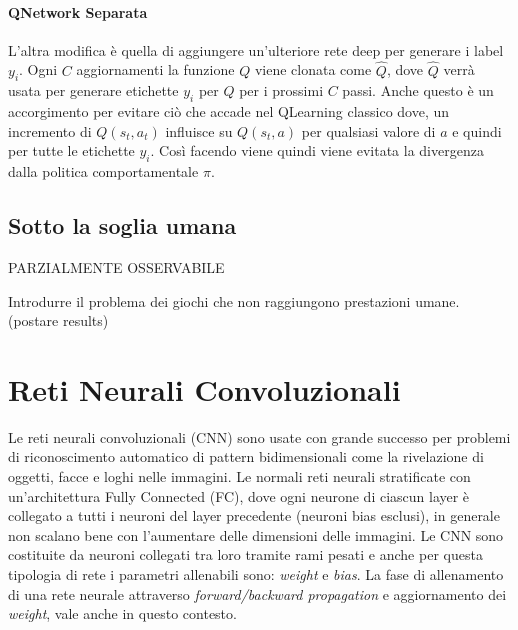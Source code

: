 \documentclass[twoside,twocolumn,10pt]{extarticle}
\theoremstyle{definition}
\begin{document}
		\paragraph*{Q\texttwelveudash Network Separata} L'altra modifica è quella di aggiungere un'ulteriore rete deep per generare i label $y_i$. Ogni $C$ aggiornamenti la funzione $Q$ viene clonata come $\hat{Q}$, dove $\hat{Q}$ verrà usata per generare etichette $y_i$ per $Q$ per i prossimi $C$ passi. Anche questo è un accorgimento per evitare ciò che accade nel Q\texttwelveudash Learning classico dove, un incremento di $Q(s_t, a_t)$ influisce su $Q(s_t, a)$ per qualsiasi valore di $a$ e quindi per tutte le etichette $y_i$. Così facendo viene quindi viene evitata la divergenza dalla politica comportamentale $\pi$.
		
		

	\subsection{Sotto la soglia umana}
		PARZIALMENTE OSSERVABILE
	
		Introdurre il problema dei giochi che non raggiungono prestazioni umane. (postare results)

\section{Reti Neurali Convoluzionali}\label{}
Le reti neurali convoluzionali (CNN) sono usate con grande successo per problemi di riconoscimento automatico di pattern bidimensionali come la rivelazione di oggetti, facce e loghi nelle immagini. Le normali reti neurali stratificate con un'architettura Fully Connected (FC), dove ogni neurone di ciascun layer è collegato a tutti i neuroni del layer precedente (neuroni bias esclusi), in generale non scalano bene con l'aumentare delle dimensioni delle immagini. Le CNN sono costituite da neuroni collegati tra loro tramite rami pesati e anche per questa tipologia di rete i parametri allenabili sono: \textit{weight} e \textit{bias}. La fase di allenamento di una rete neurale attraverso \textit{forward/backward propagation} e aggiornamento dei \textit{weight}, vale anche in questo contesto. 
\end{document}
